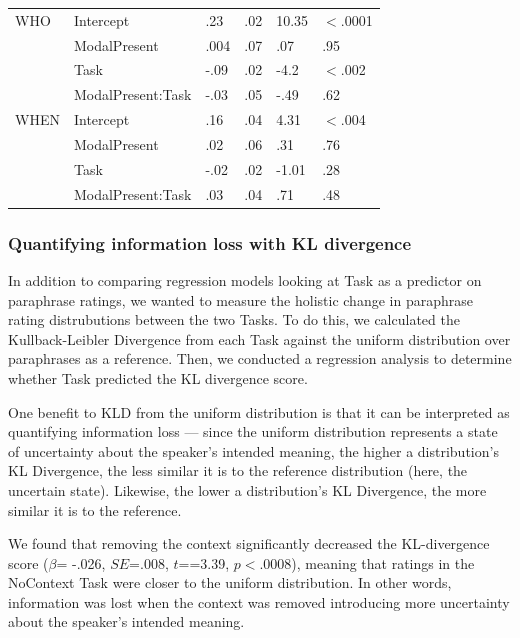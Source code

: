 \documentclass[12pt,letterpaper,table,svgnames,dvipsnames]{article}
\begin{document}
\begin{table}
\begin{center}
\begin{tabular}{llllll}
WHO & Intercept & .23 & .02 & 10.35 & $<$.0001\\
{} & ModalPresent & .004 & .07 & .07 & .95\\
{} & Task & -.09 & .02 & -4.2 & $<$.002\\
{} & ModalPresent:Task & -.03 & .05 & -.49 & .62\\
\midrule
WHEN & Intercept & .16 & .04 & 4.31 & $<$.004\\
{} & ModalPresent & .02 & .06 & .31 & .76\\
{} & Task & -.02 & .02 & -1.01 & .28\\
{} & ModalPresent:Task & .03 & .04 & .71 & .48\\
\bottomrule
\end{tabular} 
\end{center} 
\end{table}



\subsubsection{Quantifying information loss with KL divergence}


In addition to comparing regression models looking at Task as a predictor on paraphrase ratings, we wanted to measure the holistic change in paraphrase rating distrubutions between the two Tasks. To do this, we calculated the Kullback-Leibler Divergence from each Task against the uniform distribution over paraphrases as a reference. Then, we conducted a regression analysis to determine whether Task predicted the KL divergence score.

One benefit to KLD from the uniform distribution is that it can be interpreted as quantifying information loss --- since the uniform distribution represents a state of uncertainty about the speaker's intended meaning, the higher a distribution's KL Divergence, the less similar it is to the reference distribution (here, the uncertain state). Likewise, the lower a distribution's KL Divergence, the more similar it is to the reference.

We found that removing the context significantly decreased the KL-divergence score ($\beta$= -.026, $SE$=.008, $t$==3.39, $p<$.0008), meaning that ratings in the NoContext Task were closer to the uniform distribution. In other words, information was lost when the context was removed introducing more uncertainty about the speaker's intended meaning.
\end{document}
